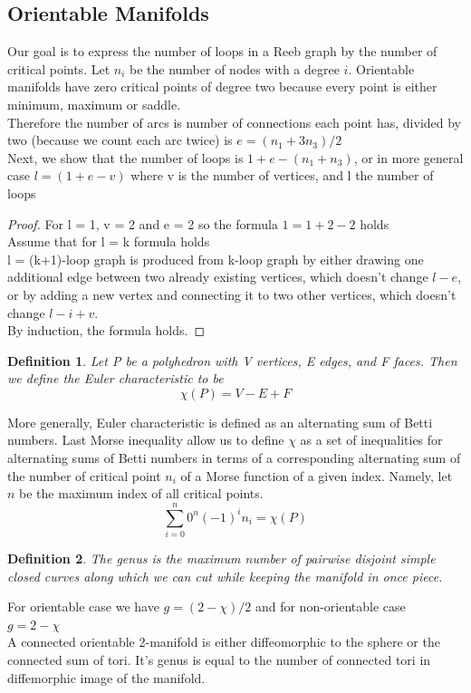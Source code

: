 \documentclass[]{article}
\newtheorem{definition}{Definition}
\begin{document}
\subsection{Orientable Manifolds} 
Our goal is to express the number of loops in a Reeb graph by the number of critical points. Let $n_i$ be the number of nodes with a degree $i$. Orientable manifolds have zero critical points of degree two because every point is either minimum, maximum or saddle.\\
Therefore the number of arcs is number of connections each point has, divided by two (because we count each arc twice) is $e = (n_1+3n_3)/2$ \\ 
Next, we show that the number of loops is $1+e-(n_1+n_3)$, or in more general case $l=(1+e-v)$ where v is the number of vertices, and l the number of loops
\begin{proof}
    For l = 1, v = 2 and e = 2 so the formula $1=1+2-2$ holds
    \\ Assume that for l = k formula holds \\
    l = (k+1)-loop graph is produced from k-loop graph by either drawing one additional edge between two already existing vertices, which doesn't change $l-e$, or by adding a new vertex and connecting it to two other vertices, which doesn't change $l-i+v$.\\
    By induction, the formula holds.
\end{proof}

\begin{definition}
    Let P be a polyhedron with V vertices, E edges, and F faces. Then we define the Euler characteristic to be 
    \begin{equation}
        \chi(P) = V - E + F  
    \end{equation}
\end{definition} 
More generally, Euler characteristic is defined as an alternating sum of Betti numbers. Last Morse inequality allow us to define $\chi$ as a set of inequalities for alternating sums of Betti numbers in terms of a corresponding alternating sum of the number of critical point $n_i$ of a Morse function of a given index. Namely, let $n$ be the maximum index of all critical points.
\begin{equation}
    \sum_{i=0}^{n} 0 ^n (-1)^i n_i = \chi(P)
\end{equation}
\begin{definition}
    The genus is the maximum number of pairwise disjoint simple closed curves along which we can cut while keeping the manifold in once piece.
\end{definition}
For orientable case we have $ g = (2 - \chi)/2$ and for non-orientable case \\ $ g = 2- \chi$ \\
A connected orientable 2-manifold is either diffeomorphic to the sphere or the connected sum of tori. It's genus is equal to the number of connected tori in diffemorphic image of the manifold.
\end{document}
